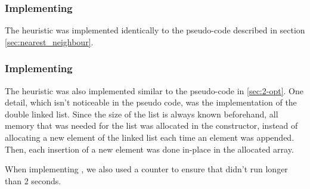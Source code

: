 \subsubsection{Implementing }
The  heuristic was implemented identically to the 
pseudo-code described in section \ref{sec:nearest_neighbour}.

\subsubsection{Implementing }
\label{sec:implementing_2-opt}
The  heuristic was also implemented similar to the pseudo-code in
\ref{sec:2-opt}. One detail, which isn't noticeable in the pseudo code, was the
implementation of the double linked list. Since the size of the list is always
known beforehand, all memory that was needed for the list was allocated in the
constructor, instead of allocating a new element of the linked list each time
an element was appended. Then, each insertion of a new element was done 
in-place in the allocated array.

When implementing , we also used a counter to ensure that
 didn't run longer than 2 seconds.
